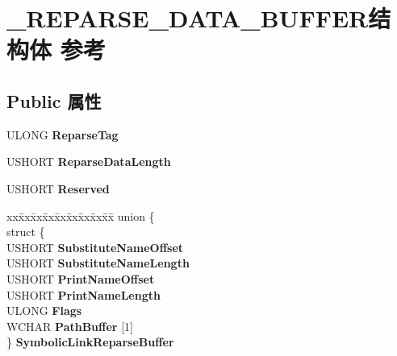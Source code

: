 \hypertarget{struct___r_e_p_a_r_s_e___d_a_t_a___b_u_f_f_e_r}{}\section{\+\_\+\+R\+E\+P\+A\+R\+S\+E\+\_\+\+D\+A\+T\+A\+\_\+\+B\+U\+F\+F\+E\+R结构体 参考}
\label{struct___r_e_p_a_r_s_e___d_a_t_a___b_u_f_f_e_r}
\subsection*{Public 属性}
\begin{DoxyCompactItemize}
\item 
\mbox{\label{struct___r_e_p_a_r_s_e___d_a_t_a___b_u_f_f_e_r_a48f7c20aaa1e9bf48b54bab58c77cee1}} 
U\+L\+O\+NG {\bfseries Reparse\+Tag}
\item 
\mbox{\label{struct___r_e_p_a_r_s_e___d_a_t_a___b_u_f_f_e_r_ad604064a54502284ae28a5a101855405}} 
U\+S\+H\+O\+RT {\bfseries Reparse\+Data\+Length}
\item 
\mbox{\label{struct___r_e_p_a_r_s_e___d_a_t_a___b_u_f_f_e_r_ab7d7ef1bac95556ac1ffee0a37e8b6d7}} 
U\+S\+H\+O\+RT {\bfseries Reserved}
\item 
\mbox{\label{struct___r_e_p_a_r_s_e___d_a_t_a___b_u_f_f_e_r_add5fc5e68e586fbf7f2b69355b095053}} 
\begin{tabbing}
xx\=xx\=xx\=xx\=xx\=xx\=xx\=xx\=xx\=\kill
union \{\\
\>struct \{\\
\>\>USHORT {\bfseries SubstituteNameOffset}\\
\>\>USHORT {\bfseries SubstituteNameLength}\\
\>\>USHORT {\bfseries PrintNameOffset}\\
\>\>USHORT {\bfseries PrintNameLength}\\
\>\>ULONG {\bfseries Flags}\\
\>\>WCHAR {\bfseries PathBuffer} \mbox{[}1\mbox{]}\\
\>\} {\bfseries SymbolicLinkReparseBuffer}\\

\end{tabbing}
\end{DoxyCompactItemize}
